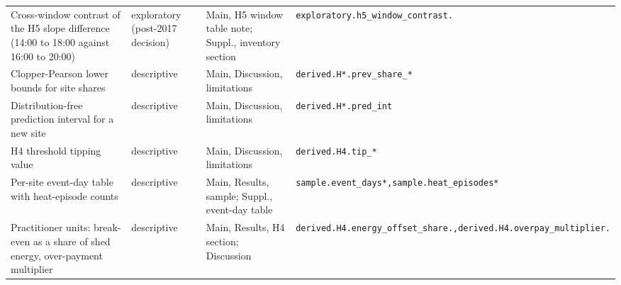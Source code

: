 {\begin{longtable}{@{}>{\raggedright\arraybackslash}p{}>{\raggedright\arraybackslash}p{}>{\raggedright\arraybackslash}p{}>{\raggedright\arraybackslash}p{}@{}}
Cross-window contrast of the H5 slope difference (14:00 to 18:00 against 16:00 to 20:00) & exploratory (post-2017 decision) & Main, H5 window table note; Suppl., inventory section & \texttt{exploratory.\allowbreak h5\_window\_contrast.\allowbreak {*}} \\
Clopper-Pearson lower bounds for site shares & descriptive & Main, Discussion, limitations & \texttt{derived.\allowbreak H{*}.\allowbreak prev\_share\_{*}} \\
Distribution-free prediction interval for a new site & descriptive & Main, Discussion, limitations & \texttt{derived.\allowbreak H{*}.\allowbreak pred\_int} \\
H4 threshold tipping value & descriptive & Main, Discussion, limitations & \texttt{derived.\allowbreak H4.\allowbreak tip\_{*}} \\
Per-site event-day table with heat-episode counts & descriptive & Main, Results, sample; Suppl., event-day table & \texttt{sample.\allowbreak event\_days{*},\allowbreak  sample.\allowbreak heat\_episodes{*}} \\
Practitioner units: break-even as a share of shed energy, over-payment multiplier & descriptive & Main, Results, H4 section; Discussion & \texttt{derived.\allowbreak H4.\allowbreak energy\_offset\_share.\allowbreak {*},\allowbreak  derived.\allowbreak H4.\allowbreak overpay\_multiplier.\allowbreak {*}} \\
\end{longtable}
\par{}
}
